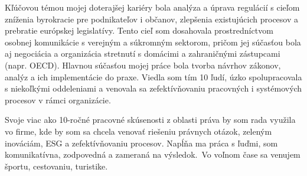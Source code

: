 

\begin{cvparagraph}

Kľúčovou témou mojej doterajšej kariéry bola analýza a úprava regulácií s cieľom zníženia byrokracie pre podnikateľov i občanov, zlepšenia existujúcich procesov a prebratie európskej legislatívy. Tento cieľ som dosahovala prostredníctvom osobnej komunikácie s verejným a súkromným sektorom, pričom jej súčasťou bola aj negociácia a organizácia stretnutí s domácimi a zahraničnými zástupcami (napr. OECD). Hlavnou súčasťou mojej práce bola tvorba návrhov zákonov, analýz a ich implementácie do praxe. Viedla som tím 10 ľudí, úzko spolupracovala s niekoľkými oddeleniami a venovala sa zefektívňovaniu pracovných i systémových procesov v rámci organizácie.

Svoje viac ako 10-ročné pracovné skúsenosti z oblasti práva by som rada využila vo firme, kde by som sa chcela venovať riešeniu právnych otázok, zeleným inováciám, ESG a zefektívňovaniu procesov. Napĺňa ma práca s ľuďmi, som komunikatívna, zodpovedná a zameraná na výsledok. Vo voľnom čase sa venujem športu, cestovaniu, turistike.
\end{cvparagraph}

